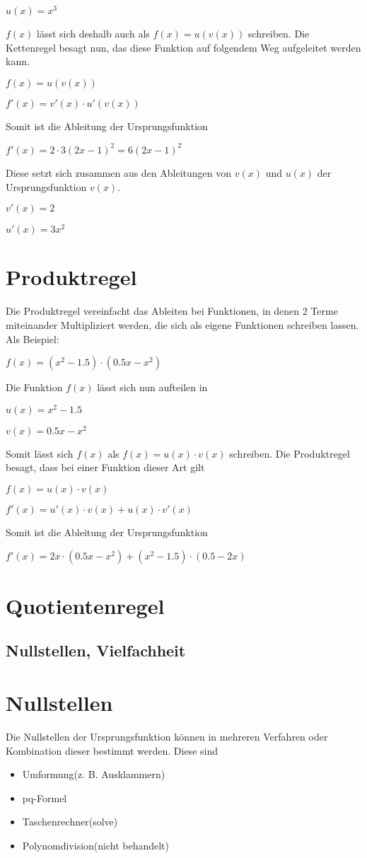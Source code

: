 $u(x) = x^3$

$f(x)$ lässt sich deshalb auch als $f(x) = u(v(x))$ schreiben.
Die Kettenregel besagt nun, das diese Funktion auf folgendem Weg aufgeleitet werden kann.

$f(x) = u(v(x))$

$f'(x) = v'(x) \cdot u'(v(x))$

Somit ist die Ableitung der Ursprungsfunktion

$f'(x) = 2 \cdot 3(2x - 1)^2 = 6(2x - 1)^2$

Diese setzt sich zusammen aus den Ableitungen von $v(x)$ und $u(x)$ der Ursprungsfunktion $v(x)$. 

$v'(x) = 2$

$u'(x) = 3x^2$

\section*{Produktregel}
Die Produktregel vereinfacht das Ableiten bei Funktionen, in denen 2 Terme
miteinander Multipliziert werden, die sich als eigene Funktionen schreiben lassen.
Als Beispiel:

$f(x) = (x^2 - 1.5) \cdot (0.5x - x^2)$

Die Funktion $f(x)$ lässt sich nun aufteilen in

$u(x) = x^2 - 1.5$

$v(x) = 0.5x - x^2$

Somit lässt sich $f(x)$ als $f(x) = u(x) \cdot v(x)$ schreiben.
Die Produktregel besagt, dass bei einer Funktion dieser Art gilt

$f(x) = u(x) \cdot v(x)$

$f'(x) = u'(x) \cdot v(x) + u(x) \cdot v'(x)$

Somit ist die Ableitung der Ursprungsfunktion

$f'(x) = 2x \cdot (0.5x - x^2) + (x^2 - 1.5) \cdot (0.5 - 2x)$

\section*{Quotientenregel}


\subsection{Nullstellen, Vielfachheit}

\section*{Nullstellen}
Die Nullstellen der Ursprungsfunktion können in mehreren Verfahren oder Kombination dieser bestimmt werden. Diese sind
\begin{itemize}
	\item Umformung(z. B. Ausklammern)
	\item pq-Formel
	\item Taschenrechner(solve)
	\item Polynomdivision(nicht behandelt)
\end{itemize}

